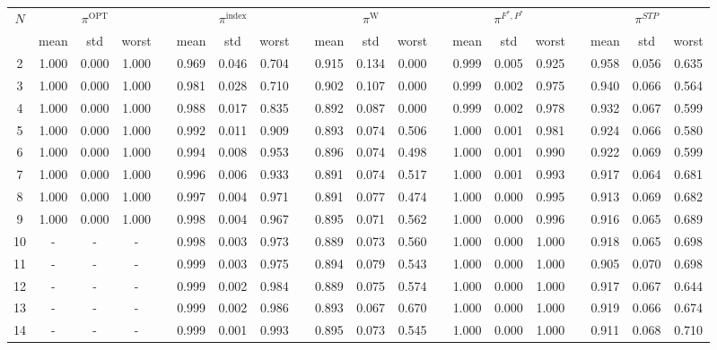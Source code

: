 \documentclass[11pt]{article}
\begin{document}
\begin{table}[H]
\scriptsize
\centering
\begin{adjustbox}{max width=\textwidth}
\begin{tabular}{cccccccccccccccccccc}
\toprule
\multirow{2}[2]{*}{$N$} & \multicolumn{3}{c}{$\pi^\textrm{OPT}$} & & \multicolumn{3}{c}{$\pi^{\textrm{index}}$} & & \multicolumn{3}{c}{$\pi^{\textrm{W}}$} & & \multicolumn{3}{c}{$\pi^{F^*,P^*}$} & & \multicolumn{3}{c}{$\pi^{STP}$} \\
\cmidrule{2-4}\cmidrule{6-8}\cmidrule{10-12}\cmidrule{14-16}\cmidrule{18-20}
  & mean & std & worst & & mean & std & worst & & mean & std & worst & & mean & std & worst & & mean & std & worst \\
\midrule
2  & 1.000 & 0.000 & 1.000 & & 0.969 & 0.046 & 0.704 & & 0.915 & 0.134 & 0.000 & & 0.999 & 0.005 & 0.925 & & 0.958 & 0.056 & 0.635 \\
3  & 1.000 & 0.000 & 1.000 & & 0.981 & 0.028 & 0.710 & & 0.902 & 0.107 & 0.000 & & 0.999 & 0.002 & 0.975 & & 0.940 & 0.066 & 0.564 \\
4  & 1.000 & 0.000 & 1.000 & & 0.988 & 0.017 & 0.835 & & 0.892 & 0.087 & 0.000 & & 0.999 & 0.002 & 0.978 & & 0.932 & 0.067 & 0.599 \\
5  & 1.000 & 0.000 & 1.000 & & 0.992 & 0.011 & 0.909 & & 0.893 & 0.074 & 0.506 & & 1.000 & 0.001 & 0.981 & & 0.924 & 0.066 & 0.580 \\
6  & 1.000 & 0.000 & 1.000 & & 0.994 & 0.008 & 0.953 & & 0.896 & 0.074 & 0.498 & & 1.000 & 0.001 & 0.990 & & 0.922 & 0.069 & 0.599 \\
7  & 1.000 & 0.000 & 1.000 & & 0.996 & 0.006 & 0.933 & & 0.891 & 0.074 & 0.517 & & 1.000 & 0.001 & 0.993 & & 0.917 & 0.064 & 0.681 \\
8  & 1.000 & 0.000 & 1.000 & & 0.997 & 0.004 & 0.971 & & 0.891 & 0.077 & 0.474 & & 1.000 & 0.000 & 0.995 & & 0.913 & 0.069 & 0.682 \\
9  & 1.000 & 0.000 & 1.000 & & 0.998 & 0.004 & 0.967 & & 0.895 & 0.071 & 0.562 & & 1.000 & 0.000 & 0.996 & & 0.916 & 0.065 & 0.689 \\
\cmidrule{1-1}
10 & - & - & - & & 0.998 & 0.003 & 0.973 & & 0.889 & 0.073 & 0.560 & & 1.000 & 0.000 & 1.000 & & 0.918 & 0.065 & 0.698 \\
11 & - & - & - & & 0.999 & 0.003 & 0.975 & & 0.894 & 0.079 & 0.543 & & 1.000 & 0.000 & 1.000 & & 0.905 & 0.070 & 0.698 \\
12 & - & - & - & & 0.999 & 0.002 & 0.984 & & 0.889 & 0.075 & 0.574 & & 1.000 & 0.000 & 1.000 & & 0.917 & 0.067 & 0.644 \\
13 & - & - & - & & 0.999 & 0.002 & 0.986 & & 0.893 & 0.067 & 0.670 & & 1.000 & 0.000 & 1.000 & & 0.919 & 0.066 & 0.674 \\
14 & - & - & - & & 0.999 & 0.001 & 0.993 & & 0.895 & 0.073 & 0.545 & & 1.000 & 0.000 & 1.000 & & 0.911 & 0.068 & 0.710 \\
\bottomrule
\end{tabular}
\end{adjustbox}
\end{table}
\end{document}
